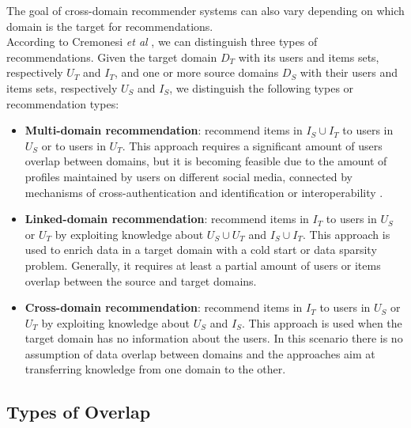 The goal of cross-domain recommender systems can also vary depending on which domain is the target for recommendations.\\
According to Cremonesi \textit{et al} \cite{10.1007/978-1-4899-7637-6_27}, we can distinguish three types of recommendations. Given the target domain $D_T$ with its users and items sets, respectively $U_T$ and $I_T$, and one or more source domains $D_S$ with their users and items sets, respectively $U_S$ and $I_S$, we distinguish the following types or recommendation types:
\begin{itemize}
\item \textbf{Multi-domain recommendation}: recommend items in $I_S \cup I_T$ to users in $U_S$ or to users in $U_T$. This approach requires a significant amount of users overlap between domains, but it is becoming feasible due to the amount of profiles maintained by users on different social media, connected by mechanisms of cross-authentication and identification \cite{10.1016/j.ins.2008.08.022} or interoperability \cite{10.1007/s11257-011-9097-5}.
\item \textbf{Linked-domain recommendation}: recommend items in $I_T$ to users in $U_S$ or $U_T$ by exploiting knowledge about $U_S \cup U_T$ and $I_S \cup I_T$. This approach is used to enrich data in a target domain with a cold start or data sparsity problem. Generally, it requires at least a partial amount of users or items overlap between the source and target domains.
\item \textbf{Cross-domain recommendation}: recommend items in $I_T$ to users in $U_S$ or $U_T$ by exploiting knowledge about $U_S$ and $I_S$. This approach is used when the target domain has no information about the users. In this scenario there is no assumption of data overlap between domains and the approaches aim at transferring knowledge from one domain to the other.
\end{itemize}


\subsection{Types of Overlap}

